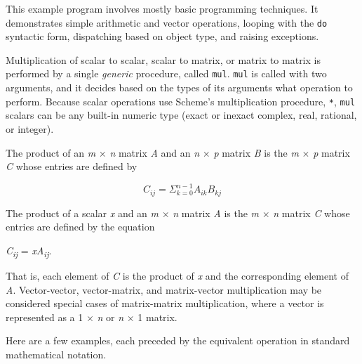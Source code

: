 \label{examples_s1}This example program involves mostly basic
programming techniques.
It demonstrates simple arithmetic and vector operations, looping
with the \texttt{do} syntactic form, dispatching based on object type,
and raising exceptions.


Multiplication of scalar to scalar, scalar to matrix, or matrix to
matrix is performed by a single \textit{generic} procedure, called
\label{examples_s2}\texttt{mul}.
\texttt{mul} is called with two arguments, and it decides based
on the types of its arguments what operation to perform.
Because scalar operations use Scheme's multiplication procedure,
\texttt{*}, \texttt{mul} scalars can be any built-in numeric type (exact or inexact
complex, real, rational, or integer).


The product of an \textit{m} \(\times\) \textit{n} matrix \textit{A} and an \textit{n} \(\times\) \textit{p} matrix \textit{B}
is the \textit{m} \(\times\) \textit{p} matrix \textit{C} whose entries are defined by


\[C_{ij}=\Sigma^{n-1}_{k=0}A_{ik}B_{kj}\]


The product of a scalar \textit{x} and an \textit{m} \(\times\) \textit{n} matrix \textit{A} is the
\textit{m} \(\times\) \textit{n} matrix \textit{C} whose entries are defined by the equation


\textit{C}\textsubscript{\textit{ij}} = \textit{xA}\textsubscript{\textit{ij}}.


That is, each element of \textit{C} is the product of \textit{x} and the corresponding
element of \textit{A}.
Vector-vector, vector-matrix, and matrix-vector multiplication may be
considered special cases of matrix-matrix multiplication, where a
vector is  represented as a 1 \(\times\) \textit{n} or \textit{n} \(\times\) 1 matrix.


Here are a few examples, each preceded by the equivalent operation
in standard mathematical notation.

